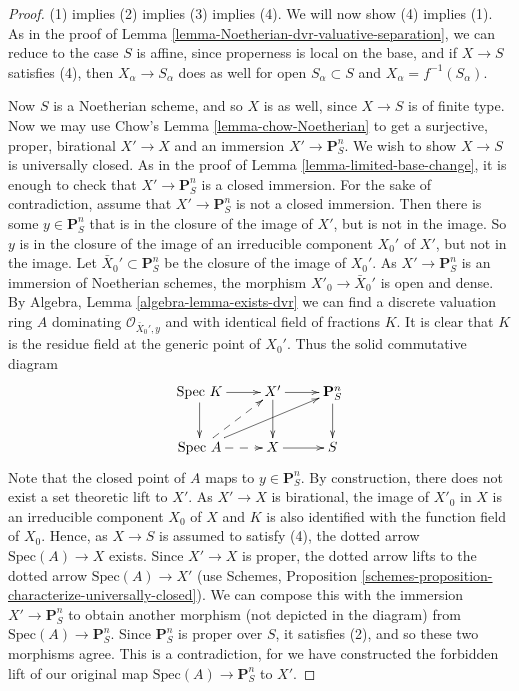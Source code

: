 \begin{proof}
(1) implies (2) implies (3) implies (4).  We will now show (4) implies
(1).  As in the proof of Lemma \ref{lemma-Noetherian-dvr-valuative-separation},
we can reduce to the
case $S$ is affine, since properness is local on the base, and if $X
\to S$ satisfies (4), then $X_\alpha \to S_\alpha$ does as well for
open $S_\alpha \subset S$ and $X_\alpha = f^{-1}(S_\alpha)$.  

\medskip\noindent
Now $S$ is a Noetherian scheme, and so $X$ is as well, since $X \to
S$ is of finite type.  Now we may use Chow's Lemma
\ref{lemma-chow-Noetherian} to get a surjective, proper, birational
$X' \to X$ and an immersion $X' \to \mathbf{P}^n_S$.  We wish to
show $X \to S$ is universally closed.  As in the proof of Lemma
\ref{lemma-limited-base-change}, it is enough to check that
$X' \to \mathbf{P}^n_S$ is a closed immersion.
For the sake of contradiction, assume that $X' \to
\mathbf{P}^n_S$ is not a closed immersion.  Then there is some $y
\in \mathbf{P}^n_S$ that is in the closure of the image of $X'$, but
is not in the image.  So $y$ is in the closure of the image of an
irreducible component $X_0'$ of $X'$, but not in the image.
Let $\bar X_0' \subset \mathbf{P}^n_S$ be the closure of 
the image of $X_0'$. As $X' \to \mathbf{P}^n_S$ is an immersion
of Noetherian schemes, the morphism $X'_0 \to \bar X_0'$ is
open and dense. By Algebra, Lemma \ref{algebra-lemma-exists-dvr} we can find
a discrete valuation ring $A$ dominating
$\mathcal{O}_{\bar X_0', y}$ and with identical field
of fractions $K$. It is clear that
$K$ is the residue field at the generic point of $X_0'$.
Thus the solid commutative diagram
\begin{equation}
\xymatrix{
\text{Spec } K \ar[r] \ar[d] & X' \ar [r] \ar[d] &
\mathbf{P}^n_S \ar[d] \\
\text{Spec } A \ar@{-->}[r] \ar@{-->}[ru] \ar[urr] & X \ar[r] & S\\
}
\end{equation}
Note that the closed point of $A$ maps to $y \in \mathbf{P}^n_S$.  By
construction, there does not exist a set theoretic lift to $X'$.
As $X' \to X$ is birational, the image of $X'_0$ in $X$ is an
irreducible component $X_0$ of $X$ and $K$ is also identified with
the function field of $X_0$. Hence, as $X \to S$ is assumed to satisfy (4),
the dotted arrow $\text{Spec}(A) \to X$ exists.
Since $X' \to X$ is proper, the dotted
arrow lifts to the dotted arrow $\text{Spec}(A) \to X'$ (use Schemes,
Proposition \ref{schemes-proposition-characterize-universally-closed}).
We can compose this with the immersion $X' \to \mathbf{P}^n_S$ to obtain
another morphism (not depicted in the diagram) from
$\text{Spec}(A) \to \mathbf{P}^n_S$.  Since $\mathbf{P}^n_S$
is proper over $S$, it satisfies (2), and so these two morphisms
agree.  This is a contradiction, for we have constructed the
forbidden lift of our original map $\text{Spec}(A) \to \mathbf{P}^n_S$
to $X'$. 
\end{proof}





















